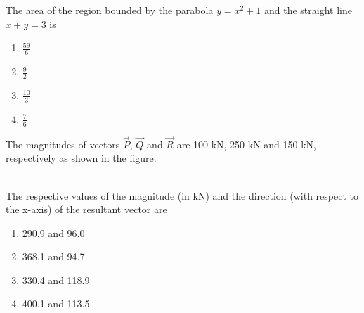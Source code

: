 \item The area of the region bounded by the parabola $y = x^2 + 1$ and the straight line $x + y = 3$ is
\begin{enumerate}
    \item $\frac{59}{6}$
    \item $\frac{9}{2}$
    \item $\frac{10}{3}$
    \item $\frac{7}{6}$ \\
\end{enumerate}
\item The magnitudes of vectors $\vec{P}$, $\vec{Q}$ and $\vec{R}$ are 100 kN, 250 kN and 150 kN, respectively as shown in the figure.
\begin{figure}[!ht]
\centering
\resizebox{0.5\textwidth}{!}{%

}%
\end{figure}
\\
The respective values of the magnitude (in kN) and the direction (with respect to the x-axis) of the resultant vector are 
\begin{enumerate}
    \item 290.9 and 96.0\degree
    \item 368.1 and 94.7\degree
    \item 330.4 and 118.9\degree
    \item 400.1 and 113.5\degree
\end{enumerate}

